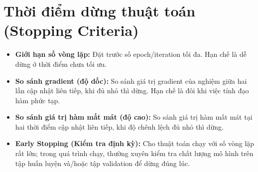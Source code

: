 \section{Thời điểm dừng thuật toán (Stopping Criteria)}

\begin{itemize}
    \item \textbf{Giới hạn số vòng lặp:} Đặt trước số epoch/iteration tối đa. Hạn chế là dễ dừng ở thời điểm chưa tối ưu.
    \item \textbf{So sánh gradient (độ dốc):} So sánh giá trị gradient của nghiệm giữa hai lần cập nhật liên tiếp, khi đủ nhỏ thì dừng. Hạn chế là đôi khi việc tính đạo hàm phức tạp.
    \item \textbf{So sánh giá trị hàm mất mát (độ cao):} So sánh giá trị hàm mất mát tại hai thời điểm cập nhật liên tiếp, khi độ chênh lệch đủ nhỏ thì dừng.
    \item \textbf{Early Stopping (Kiểm tra định kỳ):} Cho thuật toán chạy với số vòng lặp rất lớn; trong quá trình chạy, thường xuyên kiểm tra chất lượng mô hình trên tập huấn luyện và/hoặc tập validation để dừng đúng lúc.
\end{itemize}